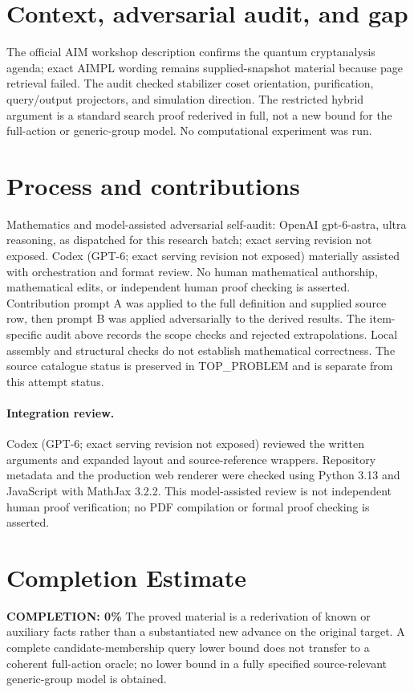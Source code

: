 \documentclass[11pt]{article}
\begin{document}
\section{Context, adversarial audit, and gap}
The official AIM workshop description confirms the quantum cryptanalysis
agenda; exact AIMPL wording remains supplied-snapshot material because page
retrieval failed. The audit checked stabilizer coset orientation, purification,
query/output projectors, and simulation direction. The restricted hybrid
argument is a standard search proof rederived in full, not a new bound for
the full-action or generic-group model. No computational experiment was run.

\section{Process and contributions}
Mathematics and model-assisted adversarial self-audit: OpenAI gpt-6-astra, ultra reasoning, as dispatched for this research batch; exact serving revision not exposed. Codex (GPT-6; exact serving revision not exposed) materially assisted with orchestration and format review. No human mathematical authorship, mathematical edits, or independent human proof checking is asserted.
Contribution prompt A was applied to the full definition and supplied source row, then prompt B was applied adversarially to the derived results. The item-specific audit above records the scope checks and rejected extrapolations. Local assembly and structural checks do not establish mathematical correctness. The source catalogue status is preserved in TOP\_PROBLEM and is separate from this attempt status.
\paragraph{Integration review.} Codex (GPT-6; exact serving revision not exposed) reviewed the written arguments and expanded layout and source-reference wrappers. Repository metadata and the production web renderer were checked using Python 3.13 and JavaScript with MathJax 3.2.2. This model-assisted review is not independent human proof verification; no PDF compilation or formal proof checking is asserted.

\section{Completion Estimate}
\noindent\textbf{COMPLETION: 0\%}
The proved material is a rederivation of known or auxiliary facts rather than a substantiated new advance on the original target. A complete candidate-membership query lower bound does not transfer to a coherent full-action oracle; no lower bound in a fully specified source-relevant generic-group model is obtained.
\end{document}
